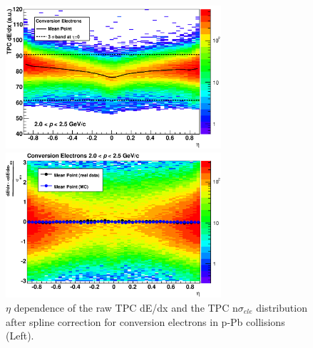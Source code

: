 {\begin{figure}[htbp]
 \begin{minipage}{0.5\hsize}
  \begin{center}
  \includegraphics[width=8cm]{chap4/figure/PID/RawTPCdEdxforConv_MB.eps}
  \end{center}
 \end{minipage}
 \begin{minipage}{0.5\hsize}
  \begin{center}
  \includegraphics[width=8cm]{chap4/figure/PID/TPCNSigmaforConv_MB.eps}
  \end{center}
 \end{minipage}
  \caption{$\eta$ dependence of the raw TPC dE/dx and the TPC n$\sigma_{ele}$ distribution after spline correction for conversion electrons in p-Pb collisions (Left).}
  \label{fig_4_tpcdedxforconv}
\end{figure}

}
